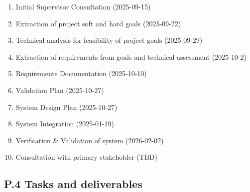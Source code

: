 \documentclass[12pt]{article}
\theoremstyle{definition}
\begin{document}
\begin{enumerate}
  \item Initial Supervisor Consultation (2025-09-15) \label{item: p3-1}
  \item Extraction of project soft and hard goals (2025-09-22) 
  \label{item: p3-2}
  \item Technical analysis for feasibility of project goals (2025-09-29) 
  \label{item: p3-3}
  \item Extraction of requirements from goals and technical assessment
  (2025-10-2) \label{item: p3-4}
  \item Requirements Documentation (2025-10-10) \label{item: p3-5}
  \item Validation Plan (2025-10-27) \label{item: p3-6}
  \item System Design Plan (2025-10-27) \label{item: p3-7}
  \item System Integration (2025-01-19) \label{item: p3-8}
  \item Verification \& Validation of system (2026-02-02) \label{item: p3-9}
  \item Consultation with primary stakeholder (TBD) \label{item: p3-10}
\end{enumerate}

\subsection{P.4 Tasks and deliverables}
\end{document}
